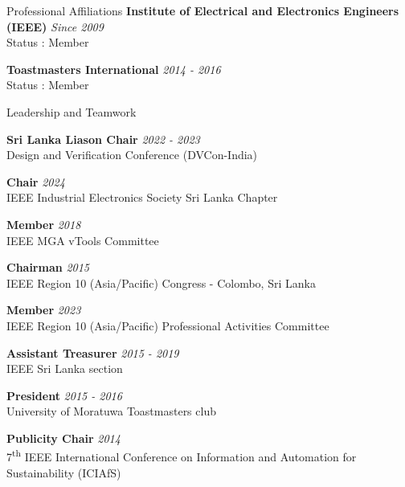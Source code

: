 \documentclass[
11pt, %
]{./assets/resume} %
\begin{document}
\begin{rSection}{Professional Affiliations}
	\textbf{Institute of Electrical and Electronics Engineers (IEEE)} \hfill \textit{Since 2009}\\
	Status : Member
	
	
	\textbf{Toastmasters International} \hfill \textit{2014 - 2016}\\
	Status : Member
	
\end{rSection}


\begin{rSection}{Leadership and Teamwork}

\textbf{Sri Lanka Liason Chair} \hfill \textit{2022 - 2023} \\
Design and Verification Conference (DVCon-India)

\textbf{Chair} \hfill \textit{2024} \\
IEEE Industrial Electronics Society Sri Lanka Chapter

\textbf{Member} \hfill \textit{2018} \\
IEEE MGA vTools Committee


\textbf{Chairman} \hfill \textit{2015} \\
IEEE Region 10 (Asia/Pacific) Congress - Colombo, Sri Lanka


\textbf{Member} \hfill \textit{2023} \\
IEEE Region 10 (Asia/Pacific) Professional Activities Committee

\textbf{Assistant Treasurer} \hfill \textit{2015 - 2019}\\
IEEE Sri Lanka section

\textbf{President} \hfill \textit{2015 - 2016} \\
University of Moratuwa Toastmasters club

\textbf{Publicity Chair} \hfill \textit{2014} \\
7\textsuperscript{th} IEEE International Conference on Information and Automation for Sustainability (ICIAfS)

\end{rSection}
\end{document}
